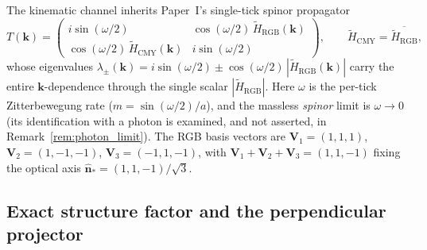 The kinematic channel inherits Paper~I's single-tick spinor
propagator~\cite{menendez2026geometryfirst}
\begin{equation}
    T(\mathbf{k}) = \begin{pmatrix}
        i\sin(\omega/2) & \cos(\omega/2)\,\tilde{H}_\text{RGB}(\mathbf{k}) \\
        \cos(\omega/2)\,\tilde{H}_\text{CMY}(\mathbf{k}) & i\sin(\omega/2)
    \end{pmatrix},
    \qquad
    \tilde{H}_\text{CMY} = \overline{\tilde{H}_\text{RGB}},
    \label{eq:propagator}
\end{equation}
whose eigenvalues
$\lambda_\pm(\mathbf{k}) = i\sin(\omega/2) \pm
\cos(\omega/2)\,|\tilde{H}_\text{RGB}(\mathbf{k})|$ carry the entire
$\mathbf{k}$-dependence through the single scalar
$|\tilde{H}_\text{RGB}|$.  Here $\omega$ is the per-tick Zitterbewegung
rate ($m = \sin(\omega/2)/a$), and the massless \emph{spinor} limit is
$\omega\to0$ (its identification with a photon is examined, and not asserted, in
Remark~\ref{rem:photon_limit}).  The RGB basis vectors are
$\mathbf{V}_1=(1,1,1)$, $\mathbf{V}_2=(1,-1,-1)$, $\mathbf{V}_3=(-1,1,-1)$,
with $\mathbf{V}_1+\mathbf{V}_2+\mathbf{V}_3=(1,1,-1)$ fixing the optical
axis $\hat{\mathbf{n}}_* = (1,1,-1)/\sqrt{3}$.

\subsection{Exact structure factor and the perpendicular projector}
\label{subsec:structure_factor}

